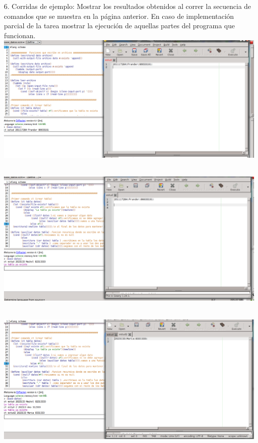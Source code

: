 \documentclass[12pt,a4paper]{report}
\begin{document}
\begin{flushleft}

6. Corridas de ejemplo: Mostrar los resultados obtenidos al correr la secuencia de comandos que se muestra en la página anterior. En caso de implementación parcial de la tarea mostrar la ejecución de aquellas partes del programa que funcionan.\\

\includegraphics[scale=0.48]{ct1.png} \\\

\includegraphics[scale=0.48]{ct2.png} \\\

\includegraphics[scale=0.48]{ct3.png} \\\


\end{flushleft}
\end{document}
